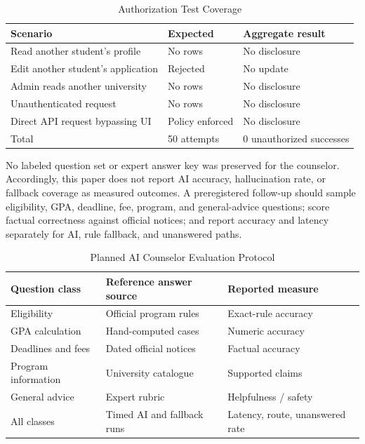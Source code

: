 \documentclass[conference,letterpaper]{IEEEtran}
\begin{document}
\begin{table}[!t]
\caption{Authorization Test Coverage}
\label{tab:security}
\centering\scriptsize
\setlength{\tabcolsep}{2pt}\renewcommand{\arraystretch}{1.04}
\begin{tabularx}{\columnwidth}{@{}X l l@{}}
\toprule
Scenario & Expected & Aggregate result\\
\midrule
Read another student's profile & No rows & No disclosure\\
Edit another student's application & Rejected & No update\\
Admin reads another university & No rows & No disclosure\\
Unauthenticated request & No rows & No disclosure\\
Direct API request bypassing UI & Policy enforced & No disclosure\\
\midrule
Total & 50 attempts & 0 unauthorized successes\\
\bottomrule
\end{tabularx}
\end{table}

No labeled question set or expert answer key was preserved for the counselor. Accordingly, this paper does not report AI accuracy, hallucination rate, or fallback coverage as measured outcomes. A preregistered follow-up should sample eligibility, GPA, deadline, fee, program, and general-advice questions; score factual correctness against official notices; and report accuracy and latency separately for AI, rule fallback, and unanswered paths.

\begin{table}[!t]
\caption{Planned AI Counselor Evaluation Protocol}
\label{tab:ai-eval}
\centering\scriptsize
\setlength{\tabcolsep}{2pt}\renewcommand{\arraystretch}{1.04}
\begin{tabularx}{\columnwidth}{@{}l X l@{}}
\toprule
Question class & Reference answer source & Reported measure\\
\midrule
Eligibility & Official program rules & Exact-rule accuracy\\
GPA calculation & Hand-computed cases & Numeric accuracy\\
Deadlines and fees & Dated official notices & Factual accuracy\\
Program information & University catalogue & Supported claims\\
General advice & Expert rubric & Helpfulness / safety\\
\midrule
All classes & Timed AI and fallback runs & Latency, route, unanswered rate\\
\bottomrule
\end{tabularx}
\end{table}
\end{document}
